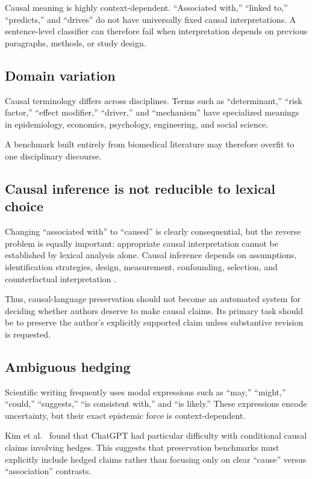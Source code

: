 \documentclass[11pt]{article}
\begin{document}
Causal meaning is highly context-dependent. ``Associated with,'' ``linked to,'' ``predicts,'' and ``drives'' do not have universally fixed causal interpretations. A sentence-level classifier can therefore fail when interpretation depends on previous paragraphs, methods, or study design.

\subsection{Domain variation}

Causal terminology differs across disciplines. Terms such as ``determinant,'' ``risk factor,'' ``effect modifier,'' ``driver,'' and ``mechanism'' have specialized meanings in epidemiology, economics, psychology, engineering, and social science.

A benchmark built entirely from biomedical literature may therefore overfit to one disciplinary discourse.

\subsection{Causal inference is not reducible to lexical choice}

Changing ``associated with'' to ``caused'' is clearly consequential, but the reverse problem is equally important: appropriate causal interpretation cannot be established by lexical analysis alone. Causal inference depends on assumptions, identification strategies, design, measurement, confounding, selection, and counterfactual interpretation \cite{pearl2009}.

Thus, causal-language preservation should not become an automated system for deciding whether authors deserve to make causal claims. Its primary task should be to preserve the author's explicitly supported claim unless substantive revision is requested.

\subsection{Ambiguous hedging}

Scientific writing frequently uses modal expressions such as ``may,'' ``might,'' ``could,'' ``suggests,'' ``is consistent with,'' and ``is likely.'' These expressions encode uncertainty, but their exact epistemic force is context-dependent.

Kim et al.~\cite{kim2023} found that ChatGPT had particular difficulty with conditional causal claims involving hedges. This suggests that preservation benchmarks must explicitly include hedged claims rather than focusing only on clear ``cause'' versus ``association'' contrasts.
\end{document}
